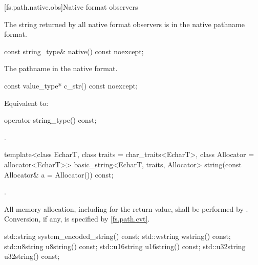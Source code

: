 [fs.path.native.obs]{Native format observers}

\pnum
The string returned by all native format observers is in the native pathname format.

%
\begin{itemdecl}
const string_type& native() const noexcept;
\end{itemdecl}

\begin{itemdescr}
\pnum
\returns
The pathname in the native format.
\end{itemdescr}

%
\begin{itemdecl}
const value_type* c_str() const noexcept;
\end{itemdecl}

\begin{itemdescr}
\pnum
\effects
Equivalent to: 
\end{itemdescr}

%
\begin{itemdecl}
operator string_type() const;
\end{itemdecl}

\begin{itemdescr}
\pnum
\returns
{}.
\end{itemdescr}

%
\begin{itemdecl}
template<class EcharT, class traits = char_traits<EcharT>, class Allocator = allocator<EcharT>>
  basic_string<EcharT, traits, Allocator> string(const Allocator& a = Allocator()) const;
\end{itemdecl}

\begin{itemdescr}
\pnum
\returns
{}.

\pnum
\remarks
All memory allocation, including for the return value, shall
be performed by . Conversion, if any, is specified by
\ref{fs.path.cvt}.
\end{itemdescr}

%
%
%
%
%
\begin{itemdecl}
std::string system_encoded_string() const;
std::wstring wstring() const;
std::u8string u8string() const;
std::u16string u16string() const;
std::u32string u32string() const;
\end{itemdecl}

